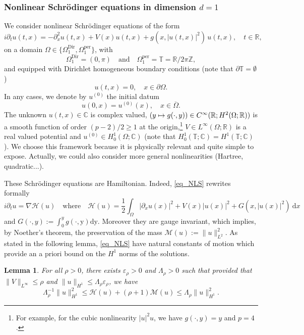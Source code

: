 \documentclass[JEP,XML,SOM,Unicode,NoEqCountersInSection,published]{cedram}
\newcommand\mto{\mathchoice{\longmapsto}{\mapsto}{\mapsto}{\mapsto}}
\newtheorem{lemma}[theorem]{Lemma}
\theoremstyle{definition}
\begin{document}
\subsubsection{Nonlinear Schrödinger equations in dimension $d=1$}
\label{sub_sec_NLS}
We consider nonlinear Schrödinger equations of the form
\begin{equation}
\label{eq_NLS}
\tag{NLS}
i\partial_t u(t,x) = -\partial_x^2 u(t,x) +V(x) u(t,x) + g(x,|u(t,x)|^2)\, u(t,x), \quad t\in \mathbb{R},
\end{equation}
on a domain $\Omega \in \{ \Omega^{\mathrm{Dir}}_1, \Omega^{\mathrm{per}}_1 \}$, with
\[
\Omega^{\mathrm{Dir}}_1= (0,\pi) \quad \text{and} \quad \Omega^{\mathrm{per}}_1= \mathbb{T} = \mathbb{R}/2\pi\mathbb{Z},
\]
and equipped with Dirichlet homogeneous boundary conditions (note that $\partial \mathbb{T} = \emptyset$)
\begin{equation}
	u(t,x)= 0, \quad x\in \partial \Omega.
\end{equation}
In any cases, we denote by $u^{(0)}$ the initial datum
\[
u(0,x) = u^{(0)}(x), \quad x\in \overline{\Omega}.
\]
The unknown $u(t,x) \in \mathbb{C}$ is complex valued, $(y \mto g(\cdot,y)) \in C^\infty(\mathbb{R}; H^{2}(\Omega;\mathbb{R}))$ is a smooth function of order $(p-2)/2 \geq 1$ at the origin,\footnote{For example, for the cubic nonlinearity $|u|^2 u$, we have $g(\cdot,y)=y$ and $p=4$.} $V\in L^\infty(\Omega;\mathbb{R})$ is a real valued potential and $u^{(0)} \in H^1_0(\Omega;\mathbb{C})$ (note that $H^1_0(\mathbb{T};\mathbb{C}) = H^1(\mathbb{T};\mathbb{C})$). We choose this framework because it is physically relevant and quite simple to expose. Actually, we could also consider more general nonlinearities (\eg Hartree, quadratic...).

These Schrödinger equations are Hamiltonian. Indeed, \eqref{eq_NLS} rewrites formally
\[
i\partial_t u = \nabla \mathcal{H}(u) \quad \text{where} \quad \mathcal{H}(u) = \frac12 \int_{\Omega} |\partial_x u(x) |^2 + V(x) |u(x)|^2 + G(x,|u(x)|^2) \ \mathrm{d}x
\]
and $G(\cdot,y):= \int_0^y g(\cdot,\mathrm{y}) \mathrm{d}\mathrm{y}$. Moreover they are gauge invariant, which implies, by Noether's theorem, the preservation of the mass $
\mathcal{M}(u):= \| u \|_{L^2}^2$. As stated in the following lemma, \eqref{eq_NLS} have natural constants of motion which provide an a priori bound on the $H^1$ norms of the solutions.

\begin{lemma} \label{lemma_Lag_NLS_coer} For all $\rho>0$, there exists $\varepsilon_\rho >0$ and $\Lambda_\rho>0$ such that provided that $\| V \|_{L^\infty} \leq \rho$ and $\|u\|_{H^1} \leq \Lambda_\rho \varepsilon_\rho$, we have
\[
\Lambda_{\rho}^{-1} \| u\|_{H^1}^2 \leq \mathcal{H}(u) + (\rho+1) \mathcal{M}(u) \leq \Lambda_{\rho} \| u\|_{H^1}^2.
\]
\end{lemma}
\end{document}
